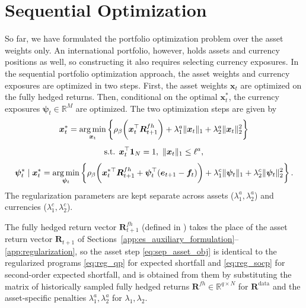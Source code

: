 \section{Sequential Optimization} \label{app:separate-optimization}
So far, we have formulated the portfolio optimization problem over the asset weights only. An international portfolio,
however, holds assets and currency positions as well, so constructing it
also requires selecting currency exposures. In the sequential portfolio optimization approach, the asset weights and currency exposures are optimized in two steps. First, the
asset weights $\bm{x}_t$ are optimized on the fully hedged returns. Then, conditional on the optimal
$\bm{x}_t^*$, the currency exposures $\bm{\psi}_t \in \mathbb{R}^M$ are optimized. The two optimization steps are given
by
\begin{equation} \label{eq:sep_asset_obj}
\begin{gathered}
    \bm{x}_t^* = \operatorname*{arg\,min}_{\bm{x}_t} \left\{ \rho_\beta\biggl( \bm{x}_t^\top \bm{R}^{fh}_{t+1} \biggr)
    + \lambda_1^a \|\bm{x}_t\|_1 + \lambda_2^a \|\bm{x}_t\|_2^2 \right\} \\[4pt]
    \text{s.t. } \bm{x}_t^\top \bm{1}_N = 1,\ \|\bm{x}_t\|_1 \le \ell^a,
\end{gathered}
\end{equation}
\begin{equation} \label{eq:sep_curr_obj}
    \bm{\psi}_t^* \mid \bm{x}_t^* = \operatorname*{arg\,min}_{\bm{\psi}_t} \left\{
    \rho_\beta\biggl( \bm{x}_t^{*\top} \bm{R}^{fh}_{t+1} + \bm{\psi}_t^\top (\bm{e}_{t+1} - \bm{f}_t) \biggr)
    + \lambda_1^c \|\bm{\psi}_t\|_1 + \lambda_2^c \|\bm{\psi}_t\|_2^2 \right\}.
\end{equation}
The regularization parameters are kept separate across assets ($\lambda_1^a, \lambda_2^a$)
and currencies ($\lambda_1^c, \lambda_2^c$).

The fully hedged return vector $\bm{R}^{fh}_{t+1}$ (defined in ) takes the place of the asset return vector $\bm{R}_{t+1}$ of
Sections~\ref{app:es_auxiliary_formulation}--\ref{app:regularization}, so the asset step \eqref{eq:sep_asset_obj} is
identical to the regularized programs \eqref{eq:reg_qp} for expected shortfall and
\eqref{eq:reg_socp} for second-order expected shortfall, and is obtained from them by
substituting the matrix of historically sampled fully hedged returns $\bm{R}^{fh}\in \mathbb{R}^{q \times N}$ for
$\bm{R}^{\text{data}}$ and the asset-specific penalties $\lambda_1^a, \lambda_2^a$ for $\lambda_1, \lambda_2$.

